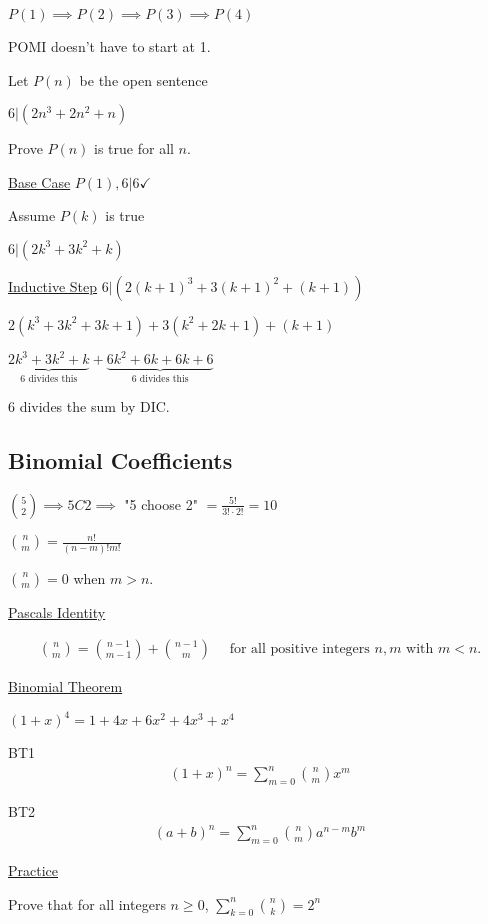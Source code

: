 \documentclass{article}
\begin{document}
$P(1) \implies P(2) \implies P(3) \implies P(4)$

POMI doesn't have to start at 1. 


Let $P(n)$ be the open sentence

$6 \vert (2n^3 + 2n^2 + n)$

Prove $P(n)$ is true for all $n$. 

\underline{Base Case}
$P(1), 6 \vert 6 \checkmark$

Assume $P(k)$ is true

$6 \vert (2k^3 + 3k^2 + k)$

\underline{Inductive Step}
$6 \vert (2(k+1)^3 + 3(k+1)^2 + (k+1))$

$2(k^3+3k^2 + 3k+1) + 3(k^2 + 2k+1) + (k+1)$

$\underbrace{2k^3 + 3k^2 + k}_{6\text{ divides this}} + \underbrace{6k^2 + 6k + 6k +6}_{6 \text{ divides this}}$

6 divides the sum by DIC.

\subsection{Binomial Coefficients}

$\binom{5}{2} \implies 5C2 \implies $ "5 choose 2" $= \frac{5!}{3! \cdot 2!} = 10$

$\binom{n}{m} = \frac{n!}{(n-m)!m!}$

$\binom{n}{m} = 0$ when $m > n$. 

\underline{Pascals Identity}

\begin{align*}
    \binom{n}{m} = \binom{n-1}{m-1} + \binom{n-1}{m} \quad \text{ for all positive integers } n,m \text{ with } m < n.
\end{align*}

\underline{Binomial Theorem}

$(1+x)^4 = 1 + 4x + 6x^2 + 4x^3 + x^4$

BT1
\begin{align*}
    (1+x)^n = \sum_{m=0}^n\binom{n}{m}x^m  
\end{align*}

BT2
\begin{align*}
    (a+b)^n = \sum_{m=0}^n\binom{n}{m}a^{n-m}b^m  
\end{align*}

\underline{Practice}

Prove that for all integers $n \ge 0$, $\sum_{k=0}^n\binom{n}{k} = 2^n$
\end{document}
